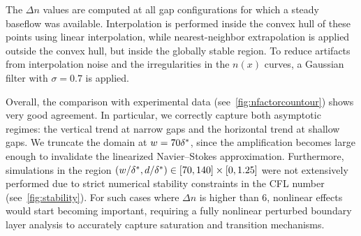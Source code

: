\documentclass[../main.tex]{subfiles}
\begin{document}
The $\Delta n$ values are computed at all gap configurations for which a steady baseflow was available. Interpolation is performed inside the convex hull of these points using linear interpolation, while nearest-neighbor extrapolation is applied outside the convex hull, but inside the globally stable region. To reduce artifacts from interpolation noise and the irregularities in the $n(x)$ curves, a Gaussian filter with $\sigma = 0.7$ is applied.

Overall, the comparison with experimental data (see~\cref{fig:nfactorcountour}) shows very good agreement. In particular, we correctly capture both asymptotic regimes: the vertical trend at narrow gaps and the horizontal trend at shallow gaps. We truncate the domain at $w = 70{\delta^*}$, since the amplification becomes large enough to invalidate the linearized Navier--Stokes approximation. Furthermore, simulations in the region $(w/{\delta^*},d/{\delta^*})\in[70,140]\times[0,1.25]$ were not extensively performed due to strict numerical stability constraints in the CFL number (see~\cref{fig:stability}). For such cases where $\Delta n$ is higher than 6, nonlinear effects would start becoming important, requiring a fully nonlinear perturbed boundary layer analysis to accurately capture saturation and transition mechanisms.
\end{document}
